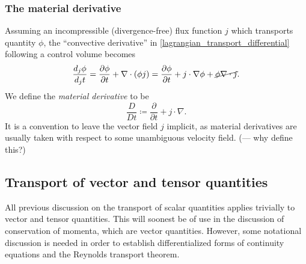 \documentclass[11pt,a4paper]{memoir}
\newcommand{\Part}[2]{\frac{\partial #1}{\partial #2}}
\begin{document}
\subsubsection{The material derivative}
Assuming an incompressible (divergence-free) flux function $j$ which transports quantity $\phi$, the ``convective derivative'' in
\eqref{lagrangian_transport_differential} following a control volume becomes
\begin{equation}
    \frac{d_j\phi}{d_j t} = \Part{\phi}{t} + \nabla\cdot(\phi j) = \Part{\phi}{t} + j\cdot\nabla\phi + \cancel{\phi \nabla\cdot j}.
\end{equation}
We define the \textit{material derivative} to be
\begin{equation}\label{material_derivative}
    \frac{D}{Dt} \coloneqq \Part{}{t} + j\cdot\nabla.
\end{equation}
It is a convention to leave the vector field $j$ implicit, as material derivatives are usually taken with respect to some unambiguous velocity field.
(--- why define this?)

\subsection{Transport of vector and tensor quantities}
All previous discussion on the transport of scalar quantities applies trivially to vector and tensor quantities.
This will soonest be of use in the discussion of conservation of momenta, which are vector quantities.
However, some notational discussion is needed in order to establish differentialized forms of continuity equations and the Reynolds transport theorem.
\end{document}

